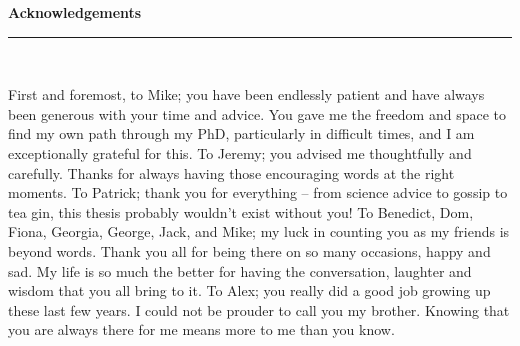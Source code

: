\thispagestyle{empty}
\begin{raggedleft}
\vspace*{23mm}
\hfill {\huge {\bf {Acknowledgements}}} \\
\vspace{6mm}
\hfill \rule{4in}{.015in} \\
\vspace{19mm}
\end{raggedleft}


First and foremost, to Mike;  you have been endlessly patient and have always been generous with your time and advice.  You gave me the freedom and space to find my own path through my PhD, particularly in difficult times, and I am exceptionally grateful for this.  
To Jeremy; %
you advised me thoughtfully and carefully. Thanks for always having those encouraging words at the right moments.
To Patrick; %
thank you for everything -- %
from science advice to gossip to tea gin, this thesis probably wouldn't exist without you!
To 
Benedict,
Dom,
Fiona,
Georgia,
George,
Jack,
and
Mike;  my luck in counting you as my friends is beyond words. %
Thank you all for being there on so many occasions, happy and sad.
My life is so much the better for having the conversation, laughter and wisdom that you all bring to it.  
To Alex;  you really did a good job growing up these last few years.  I could not be prouder to call you my brother.  Knowing that you are always there for me means more to me than you know. 
